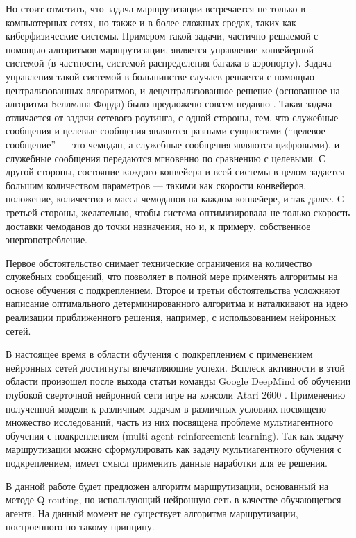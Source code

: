 \documentclass[specification, annotation]{itmo-student-thesis}
\begin{document}
Но стоит отметить, что задача маршрутизации встречается не только в компьютерных сетях, но
также и в более сложных средах, таких как киберфизические системы. Примером такой
задачи, частично решаемой с помощью алгоритмов маршрутизации, является
управление конвейерной системой (в частности, системой распределения багажа в
аэропорту). Задача управления такой системой в большинстве случаев решается с
помощью централизованных алгоритмов, и децентрализованное решение (основанное на
алгоритма Беллмана-Форда) было предложено совсем недавно \cite{vyatkin-controllers}. 
Такая задача отличается от задачи сетевого роутинга, с одной
стороны, тем, что служебные сообщения и целевые сообщения являются разными
сущностями (``целевое сообщение'' --- это чемодан, а служебные сообщения являются
цифровыми), и служебные сообщения передаются мгновенно по сравнению с целевыми.
С другой стороны, состояние каждого конвейера и всей системы в целом задается
большим количеством параметров --- такими как скорости конвейеров, положение,
количество и масса чемоданов на каждом конвейере, и так далее. С третьей
стороны, желательно, чтобы система оптимизировала не только скорость доставки
чемоданов до точки назначения, но и, к примеру, собственное энергопотребление.

Первое обстоятельство снимает технические ограничения на количество служебных
сообщений, что позволяет в полной мере применять алгоритмы на основе обучения с
подкреплением. Второе и третьи обстоятельства усложняют написание оптимального
детерминированного алгоритма и наталкивают на идею реализации приближенного
решения, например, с использованием нейронных сетей.

В настоящее время в области обучения с подкреплением с применением нейронных
сетей достигнуты впечатляющие успехи. Всплеск активности в этой области
произошел после выхода статьи команды Google DeepMind об обучении глубокой
сверточной нейронной сети игре на консоли Atari 2600 \cite{deepmind-dqn-orig}.
Применению полученной модели к различным задачам в различных условиях посвящено
множество исследований, часть из них посвящена проблеме мультиагентного обучения
с подкреплением (multi-agent reinforcement learning). Так как задачу
маршрутизации можно сформулировать как задачу мультиагентного обучения с
подкреплением, имеет смысл применить данные наработки для ее решения.

В данной работе будет предложен алгоритм маршрутизации, основанный на методе
Q-routing, но использующий нейронную сеть в качестве обучающегося агента.
На данный момент не существует алгоритма маршрутизации, построенного по такому
принципу.
\end{document}
